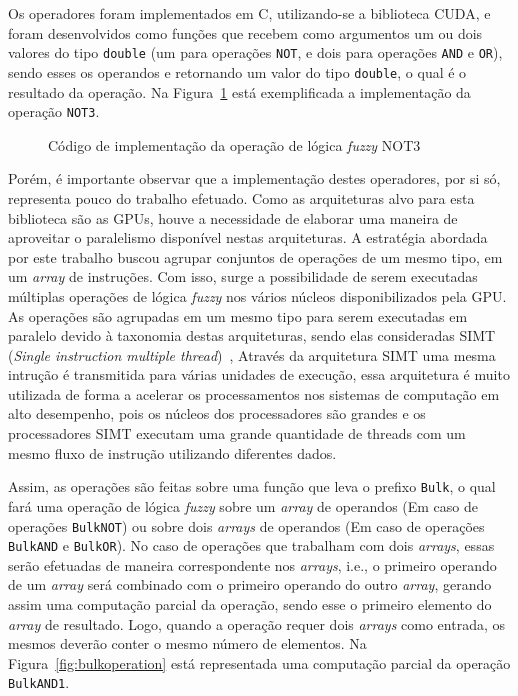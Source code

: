 \documentclass[12pt]{article}
\begin{document}
Os operadores foram implementados em C, utilizando-se a biblioteca CUDA, e foram desenvolvidos como funções que recebem como argumentos um ou dois valores do tipo \texttt{double} (um para operações \texttt{NOT}, e dois para operações \texttt{AND} e \texttt{OR}), sendo esses os operandos e retornando um valor do tipo \texttt{double}, o qual é o resultado da operação. Na Figura~\ref{fig:operation} está exemplificada a implementação da operação \texttt{NOT3}.

\begin{figure}[!h]
\centering

\caption{Código de implementação da operação de lógica \textit{fuzzy} NOT3}
\label{fig:operation}
\end{figure}

Porém, é importante observar que a implementação destes operadores, por si só, representa pouco do trabalho efetuado. Como as arquiteturas alvo para esta biblioteca são as GPUs, houve a necessidade de elaborar uma maneira de aproveitar o paralelismo disponível nestas arquiteturas. A estratégia abordada por este trabalho buscou agrupar conjuntos de operações de um mesmo tipo, em um \textit{array} de instruções. Com isso, surge a possibilidade de serem executadas múltiplas operações de lógica \textit{fuzzy} nos vários núcleos disponibilizados pela GPU. As operações são agrupadas em um mesmo tipo para serem executadas em paralelo devido à taxonomia destas arquiteturas, sendo elas consideradas SIMT (\textit{Single instruction multiple thread})~\cite{keckler:11}, Através da arquitetura SIMT uma mesma intrução é transmitida para várias unidades de execução, essa arquitetura é muito utilizada de forma a acelerar os processamentos nos sistemas de computação em alto desempenho, pois os núcleos dos processadores são grandes e os processadores SIMT executam uma grande quantidade de threads com um mesmo fluxo de instrução utilizando diferentes dados. \cite{lain:12}

Assim, as operações são feitas sobre uma função que leva o prefixo \texttt{Bulk}, o qual fará uma operação de lógica \textit{fuzzy} sobre um \textit{array} de operandos (Em caso de operações \texttt{BulkNOT}) ou sobre dois \textit{arrays} de operandos (Em caso de operações \texttt{BulkAND} e \texttt{BulkOR}). No caso de operações que trabalham com dois \textit{arrays}, essas serão efetuadas de maneira correspondente nos \textit{arrays}, i.e., o primeiro operando de um \textit{array} será combinado com o primeiro operando do outro \textit{array}, gerando assim uma computação parcial da operação, sendo esse o primeiro elemento do \textit{array} de resultado. Logo, quando a operação requer dois \textit{arrays} como entrada, os mesmos deverão conter o mesmo número de elementos. Na Figura~\ref{fig:bulkoperation} está representada uma computação parcial da operação \texttt{BulkAND1}.
\end{document}
